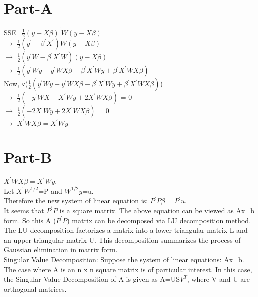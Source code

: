 \documentclass[12pt]{article}
\begin{document}

\baselineskip 16pt
\section{Part-A}
\noindent
SSE=$\frac{1}{2}(y-X\beta)^{\prime}W(y-X\beta)$\\[6pt]
$\rightarrow$ $\frac{1}{2}(y^{\prime}-\beta^{\prime}X^{\prime})W(y-X\beta)$\\[6pt]
$\rightarrow$ $\frac{1}{2}(y^{\prime}W-\beta^{\prime}X^{\prime}W)(y-X\beta)$\\[6pt]
$\rightarrow$ $\frac{1}{2}(y^{\prime}Wy-y^{\prime}WX\beta-\beta^{\prime}X^{\prime}Wy+\beta^{\prime}X^{\prime}WX\beta)$\\[6pt]
Now, $\triangledown$($\frac{1}{2}(y^{\prime}Wy-y^{\prime}WX\beta-\beta^{\prime}X^{\prime}Wy+\beta^{\prime}X^{\prime}WX\beta)$)\\[6pt]
$\rightarrow$ $\frac{1}{2}(-y^{\prime}WX-X^{\prime}Wy+2X^{\prime}WX\beta)$ = 0\\[6pt]
$\rightarrow$ $\frac{1}{2}(-2X^{\prime}Wy+2X^{\prime}WX\beta)$ = 0\\[6pt]
$\rightarrow$ $X^{\prime}WX\beta = X^{\prime}Wy$
 
\section{Part-B}
\noindent

$X^{\prime}WX\beta = X^{\prime}Wy$.\\
Let $X^{\prime}W^{1/2}$=P and $W^{1/2}y$=u.\\
Therefore the new system of linear equation is: $P^{\prime}P\beta=P^{\prime}u$.\\
It seems that $P^{\prime}P$ is a square matrix. The above equation can be viewed as Ax=b form. 
So this A ($P^{\prime}P$) matrix can be decomposed via LU decomposition method.
The LU decomposition factorizes a matrix into a lower triangular matrix L and an upper triangular matrix U.
This decomposition summarizes the process of Gaussian elimination in matrix form.\\[6pt]

Singular Value Decomposition: Suppose the system of linear equations: Ax=b.\\
The case where A is an n x n square matrix is of particular interest.
In this case, the Singular Value Decomposition of A is given as A=US$V^{T}$, where V and U are orthogonal matrices.\\[6pt]
\end{document}
